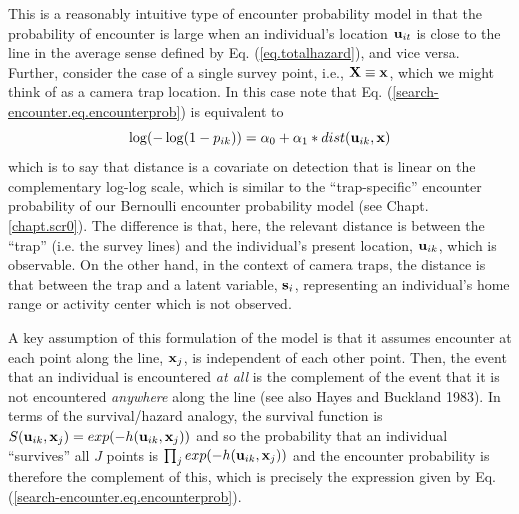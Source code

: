 This is a reasonably intuitive type of encounter probability model in
that the probability of encounter is large when an individual's
location ${\bf u}_{it}$ is close to the line in the average sense
defined by Eq. (\ref{eq.totalhazard}), and vice versa.
Further, consider the case of a single survey point, i.e., ${\bf X} \equiv {\bf
  x}$, which we might think of as a camera trap location.  In this
case note that Eq. (\ref{search-encounter.eq.encounterprob}) is equivalent to
\[
\log(-\log(1-p_{ik})) = \alpha_{0} + \alpha_{1}*dist( {\bf u}_{ik},{\bf x})
\]
which is to say that distance is a covariate on detection that is
linear on the complementary log-log scale, which is similar to the
``trap-specific'' encounter probability of our Bernoulli encounter
probability model (see Chapt. \ref{chapt.scr0}).
The difference is that, here, the relevant distance
is between the ``trap'' (i.e. the survey lines) and the individual's
present location, ${\bf u}_{ik}$, which is observable. On the other
hand, in the context of camera traps, the distance is that between the
trap and a latent variable, ${\bf s}_{i}$, representing an
individual's home range or activity center which is not observed.


A key assumption of this formulation of the model is that it assumes
encounter at each point along the line, ${\bf x}_{j}$, is
independent of each other point. Then, the event that an individual is
encountered {\it at all} is the complement of the event that it is not
encountered {\it anywhere} along the line (see also Hayes and Buckland
1983).  In terms of the survival/hazard analogy, the survival function
is $S({\bf u}_{ik},{\bf x}_{j}) = exp(-h({\bf u}_{ik},{\bf x}_{j}))$
and so the probability that an individual ``survives'' all $J$ points
is $\prod_{j} exp(-h({\bf u}_{ik},{\bf x}_{j}))$ and the encounter
probability is therefore the complement of this, which is precisely
the expression given by Eq. (\ref{search-encounter.eq.encounterprob}).


